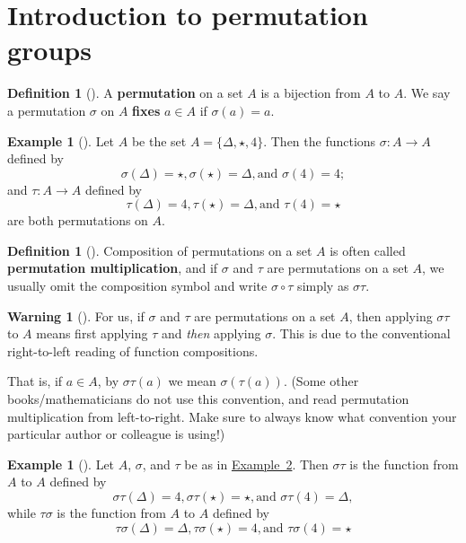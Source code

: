 \documentclass[10pt,openany,oneside]{book}
\newcommand{\terminology}[1]{\textbf{#1}}
\theoremstyle{plain}
\theoremstyle{definition}
\newtheorem{definition}[theorem]{Definition}
\theoremstyle{definition}
\newtheorem{warning}[theorem]{Warning}
\theoremstyle{definition}
\newtheorem{example}[theorem]{Example}
\theoremstyle{definition}
\numberwithin{equation}{section}
\begin{document}
\section[{Introduction to permutation groups}]{Introduction to permutation groups}\label{section-17}
\begin{definition}[{}]\label{definition-41}
A \terminology{permutation} on a set \(A\) is a bijection from \(A\) to \(A\). We say a permutation \(\sigma\) on \(A\) \terminology{fixes} \(a\in
A\) if \(\sigma(a)=a\).%
\end{definition}
\begin{example}[]\label{stperm}
Let \(A\) be the set \(A=\{\Delta, \star, 4\}\). Then the functions \(\sigma : A\to A\) defined by%
\begin{equation*}
\sigma(\Delta)=\star,
\sigma(\star)=\Delta,  \text{and }  \sigma(4)=4;
\end{equation*}
and \(\tau : A\to A\) defined by%
\begin{equation*}
\tau(\Delta)=4,
\tau(\star)=\Delta,  \text{and }  \tau(4)=\star
\end{equation*}
are both permutations on \(A\).%
\end{example}
\begin{definition}[{}]\label{definition-42}
Composition of permutations on a set \(A\) is often called \terminology{permutation multiplication}, and if \(\sigma\) and \(\tau\) are permutations on a set \(A\), we usually omit the composition symbol and write \(\sigma \circ \tau\) simply as \(\sigma \tau\).%
\end{definition}
\begin{warning}[]\label{warning-16}
For us, if \(\sigma\) and \(\tau\) are permutations on a set \(A\), then applying \(\sigma \tau\) to \(A\) means first applying \(\tau\) and \emph{then} applying \(\sigma\). This is due to the conventional right-to-left reading of function compositions.%
\end{warning}
That is, if \(a\in A\), by \(\sigma \tau(a)\) we mean \(\sigma(\tau(a))\). (Some other books/mathematicians do not use this convention, and read permutation multiplication from left-to-right. Make sure to always know what convention your particular author or colleague is using!)%
\begin{example}[]\label{example-48}
Let \(A\), \(\sigma\), and \(\tau\) be as in \hyperref[stperm]{Example~2}. Then \(\sigma \tau\) is the function from \(A\) to \(A\) defined by%
\begin{equation*}
\sigma \tau(\Delta)=4,  \sigma \tau(\star)=\star,  \text{and }  \sigma \tau(4)=\Delta,
\end{equation*}
while \(\tau \sigma\) is the function from \(A\) to \(A\) defined by%
\begin{equation*}
\tau \sigma (\Delta)=\Delta,  \tau \sigma (\star)=4,  \text{and }  \tau \sigma(4)=\star
\end{equation*}
%
\end{example}
\end{document}
